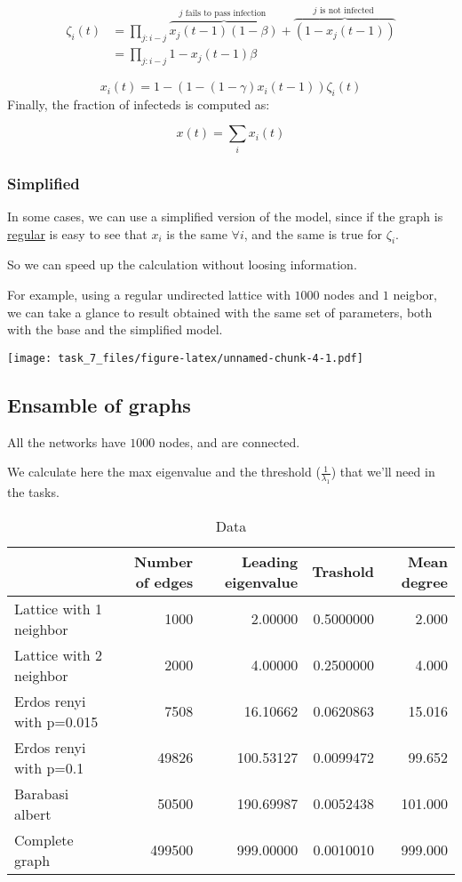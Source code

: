 \documentclass[]{article}
\begin{document}
\[
\begin{aligned} \zeta_{i}(t) &=\prod_{j: i-j} \overbrace{x_{j}(t-1)(1-\beta)}^{j \text { fails to pass infection }}+\overbrace{\left(1-x_{j}(t-1)\right)}^{j \text { is not infected }} \\ &=\prod_{j: i-j} 1-x_{j}(t-1) \beta \end{aligned}
\]

\[
x_{i}(t)=1-\left(1-(1-\gamma) x_{i}(t-1)\right) \zeta_{i}(t)
\] Finally, the fraction of infecteds is computed as:

\[
x(t)=\sum_{i} x_{i}(t)
\]

\subsubsection{Simplified}\label{simplified}

In some cases, we can use a simplified version of the model, since if
the graph is \href{https://en.wikipedia.org/wiki/Regular_graph}{regular}
is easy to see that \(x_i\) is the same \(\forall i\), and the same is
true for \(\zeta_i\).

So we can speed up the calculation without loosing information.

For example, using a regular undirected lattice with \(1000\) nodes and
\(1\) neigbor, we can take a glance to result obtained with the same set
of parameters, both with the base and the simplified model.

\texttt{[image: task\_7\_files/figure-latex/unnamed-chunk-4-1.pdf]}

\subsection{Ensamble of graphs}\label{ensamble-of-graphs}

All the networks have \(1000\) nodes, and are connected.

We calculate here the max eigenvalue and the threshold
(\(\frac{1}{\lambda_1}\)) that we'll need in the tasks.

\begin{table}[H]

\caption{\label{tab:unnamed-chunk-8}Data}
\centering
\begin{tabular}[t]{lrrrr}
\toprule
  & Number of edges & Leading eigenvalue & Trashold & Mean degree\\
\midrule
Lattice with 1 neighbor & 1000 & 2.00000 & 0.5000000 & 2.000\\
Lattice with 2 neighbor & 2000 & 4.00000 & 0.2500000 & 4.000\\
Erdos renyi with p=0.015 & 7508 & 16.10662 & 0.0620863 & 15.016\\
Erdos renyi with p=0.1 & 49826 & 100.53127 & 0.0099472 & 99.652\\
Barabasi albert & 50500 & 190.69987 & 0.0052438 & 101.000\\
Complete graph & 499500 & 999.00000 & 0.0010010 & 999.000\\
\bottomrule
\end{tabular}
\end{table}
\end{document}
